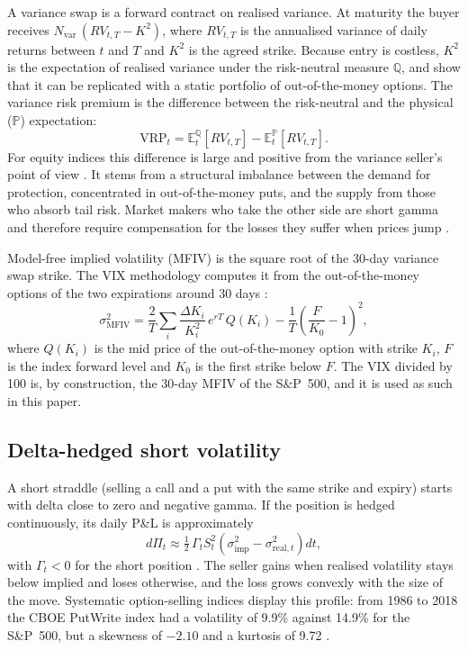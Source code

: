 \documentclass[11pt,a4paper]{article}
\newcommand{\E}{\mathbb{E}}
\begin{document}
A variance swap is a forward contract on realised variance. At maturity the buyer receives $N_{\text{var}}\,(RV_{t,T}-K^2)$, where $RV_{t,T}$ is the annualised variance of daily returns between $t$ and $T$ and $K^2$ is the agreed strike. Because entry is costless, $K^2$ is the expectation of realised variance under the risk-neutral measure $\mathbb{Q}$, and \citet{carrwu2009} show that it can be replicated with a static portfolio of out-of-the-money options. The variance risk premium is the difference between the risk-neutral and the physical ($\mathbb{P}$) expectation:
\begin{equation}
  \text{VRP}_t = \E^{\mathbb{Q}}_t[RV_{t,T}] - \E^{\mathbb{P}}_t[RV_{t,T}].
\end{equation}
For equity indices this difference is large and positive from the variance seller's point of view \citep{carrwu2009}. It stems from a structural imbalance between the demand for protection, concentrated in out-of-the-money puts, and the supply from those who absorb tail risk. Market makers who take the other side are short gamma and therefore require compensation for the losses they suffer when prices jump \citep{ang2018,israelov2019}.

Model-free implied volatility (MFIV) is the square root of the 30-day variance swap strike. The VIX methodology computes it from the out-of-the-money options of the two expirations around 30 days \citep{cboe2019}:
\begin{equation}\label{eq:mfiv}
  \sigma^2_{\text{MFIV}} = \frac{2}{T}\sum_i \frac{\Delta K_i}{K_i^2}\,e^{rT}\,Q(K_i) - \frac{1}{T}\left(\frac{F}{K_0}-1\right)^2,
\end{equation}
where $Q(K_i)$ is the mid price of the out-of-the-money option with strike $K_i$, $F$ is the index forward level and $K_0$ is the first strike below $F$. The VIX divided by 100 is, by construction, the 30-day MFIV of the S\&P~500, and it is used as such in this paper.

\subsection{Delta-hedged short volatility}

A short straddle (selling a call and a put with the same strike and expiry) starts with delta close to zero and negative gamma. If the position is hedged continuously, its daily P\&L is approximately
\begin{equation}\label{eq:gamma}
  d\Pi_t \approx \tfrac{1}{2}\,\Gamma_t S_t^2\left(\sigma^2_{\text{imp}}-\sigma^2_{\text{real},t}\right)dt,
\end{equation}
with $\Gamma_t<0$ for the short position \citep{sinclair2008}. The seller gains when realised volatility stays below implied and loses otherwise, and the loss grows convexly with the size of the move. Systematic option-selling indices display this profile: from 1986 to 2018 the CBOE PutWrite index had a volatility of 9.9\% against 14.9\% for the S\&P~500, but a skewness of $-2.10$ and a kurtosis of 9.72 \citep{wilshire2019}.
\end{document}
